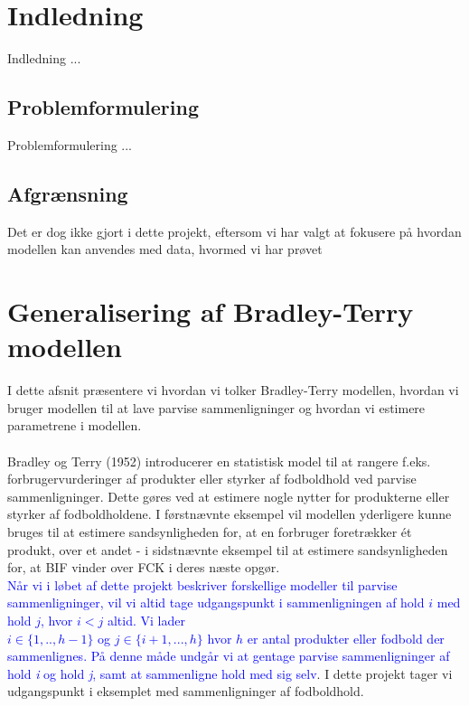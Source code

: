 \documentclass[11pt,a4paper]{article}
\begin{document}
\section{Indledning}
Indledning ...
\subsection{Problemformulering}
Problemformulering ...
\subsection{Afgrænsning}
Det er dog ikke gjort i dette projekt, eftersom vi har valgt at fokusere på hvordan modellen kan anvendes med data, hvormed vi har prøvet
\section{Generalisering af Bradley-Terry modellen}
I dette afsnit præsentere vi hvordan vi tolker Bradley-Terry modellen, hvordan vi bruger modellen til at lave parvise sammenligninger og hvordan vi estimere parametrene i modellen.\\\\
Bradley og Terry (1952)\cite{BradleyTerry} introducerer en statistisk model til at rangere f.eks. forbrugervurderinger af produkter eller styrker af fodboldhold ved parvise sammenligninger. Dette gøres ved at estimere nogle nytter for produkterne eller styrker af fodboldholdene. I førstnævnte eksempel vil modellen yderligere kunne bruges til at estimere sandsynligheden for, at en forbruger foretrækker ét produkt, over et andet - i sidstnævnte eksempel til at estimere sandsynligheden for, at BIF vinder over FCK i deres næste opgør.\\
\textcolor{blue}{Når vi i løbet af dette projekt beskriver forskellige modeller til parvise sammenligninger, vil vi altid tage udgangspunkt i sammenligningen af hold $i$ med hold $j$, hvor $i<j$ altid. Vi lader \\$i \in \{1,..,h-1\}$ og $j\in \{i+1,...,h\}$ hvor $h$ er antal produkter eller fodbold der sammenlignes. På denne måde undgår vi at gentage parvise sammenligninger af hold \textit{i} og hold \textit{j}, samt at sammenligne hold med sig selv}.  I dette projekt tager vi udgangspunkt i eksemplet med sammenligninger af fodboldhold. 
\end{document}
